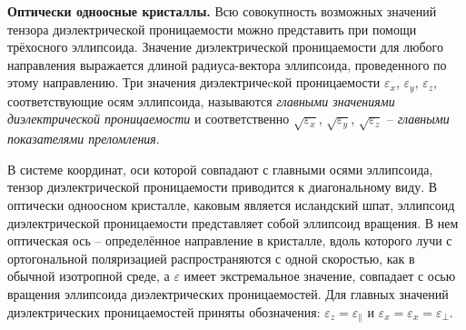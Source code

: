 \documentclass[a4paper,12pt]{article}
\begin{document}
\textbf{Оптически одноосные кристаллы.} 
Всю совокупность возможных значений тензора диэлектрической проницаемости можно представить при помощи трёхосного эллипсоида. Значение диэлектрической проницаемости для любого направления выражается длиной радиуса-вектора эллипсоида, проведенного по этому направлению. Три значения диэлектричеcкой проницаемости $\varepsilon_x$, $\varepsilon_y$, $\varepsilon_z$, соответствующие осям эллипсоида, называются \textit{главными значениями диэлектрической проницаемости} и соответственно $\sqrt{\varepsilon_x}$, $\sqrt{\varepsilon_y}$, $\sqrt{\varepsilon_z}$ -- \textit{главными показателями преломления}.

В системе координат, оси которой совпадают с главными осями эллипсоида, тензор диэлектрической проницаемости приводится к диагональному виду. В оптически одноосном кристалле, каковым является исландский шпат, эллипсоид диэлектрической проницаемости представляет собой эллипсоид вращения. В нем оптическая ось -- определённое направление в кристалле, вдоль которого лучи с ортогональной поляризацией распространяются с одной скоростью, как в обычной изотропной среде, а $\varepsilon$ имеет экстремальное значение, совпадает с осью вращения эллипсоида диэлектрических проницаемостей. Для главных значений диэлектрических проницаемостей приняты обозначения: $\varepsilon_z = \varepsilon_{\|}$ и $\varepsilon_x = \varepsilon_x = \varepsilon_{\perp}$.
\end{document}

